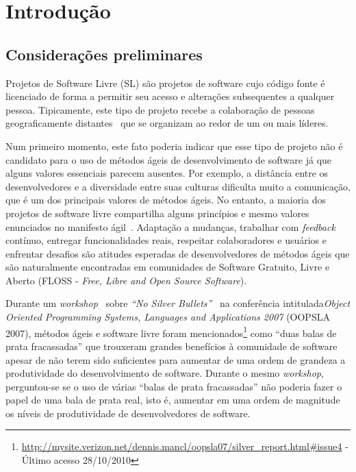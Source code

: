 \chapter{Introdução}
\label{cap:introducao}

\section{Considerações preliminares}
\label{sec:consideracoes_preliminares}

Projetos de Software Livre (SL) são projetos de software cujo código
fonte é licenciado de forma a permitir seu acesso e alterações
subsequentes a qualquer pessoa. Tipicamente, este tipo de projeto
recebe a colaboração de pessoas geograficamente
distantes~\cite{Dempsey1999} que se organizam ao redor de um ou mais
líderes.

Num primeiro momento, este fato poderia indicar que esse tipo de
projeto não é candidato para o uso de métodos ágeis de desenvolvimento
de software já que alguns valores essenciais parecem ausentes. Por
exemplo, a distância entre os desenvolvedores e a diversidade entre
suas culturas dificulta muito a comunicação, que é um dos principais
valores de métodos ágeis. No entanto, a maioria dos projetos de
software livre compartilha alguns princípios e mesmo valores
enunciados no manifesto ágil~\cite{AgileManifesto}. Adaptação a
mudanças, trabalhar com \emph{feedback} contínuo, entregar
funcionalidades reais, respeitar colaboradores e usuários e enfrentar
desafios são atitudes esperadas de desenvolvedores de métodos ágeis
que são naturalmente encontradas em comunidades de Software Gratuito,
Livre e Aberto (FLOSS - \emph{Free, Libre and Open Source Software}).

Durante um \emph{workshop}~\cite{OOPSLA07} sobre \emph{``No Silver
  Bullets''}~\cite{Brooks1987} na conferência intitulada\emph{Object
  Oriented Programming Systems, Languages and Applications 2007}
(OOPSLA 2007), métodos ágeis e software livre foram
mencionados\footnote{\url{http://mysite.verizon.net/dennis.mancl/oopsla07/silver_report.html\#issue4}
  - Último acesso 28/10/2010} como ``duas balas de prata fracassadas''
que trouxeram grandes benefícios à comunidade de software apesar de
não terem sido suficientes para aumentar de uma ordem de grandeza a
produtividade do desenvolvimento de software. Durante o mesmo
\emph{workshop}, perguntou-se se o uso de várias ``balas de prata
fracassadas'' não poderia fazer o papel de uma bala de prata real,
isto é, aumentar em uma ordem de magnitude os níveis de produtividade
de desenvolvedores de software.

